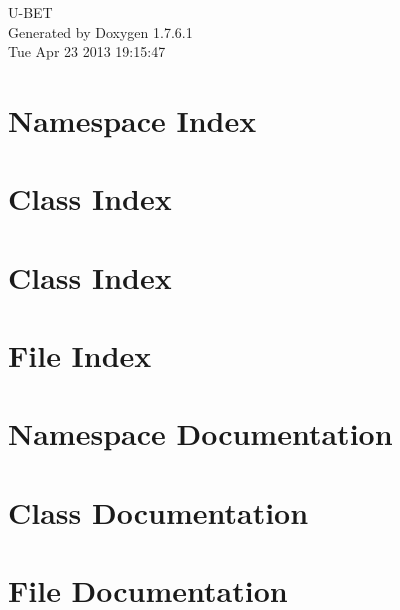 \documentclass[a4paper]{book}
\begin{document}
\hypersetup{pageanchor=false,citecolor=blue}
\begin{titlepage}
\vspace*{7cm}
\begin{center}
{\Large \-U-\/\-B\-E\-T }\\
\vspace*{1cm}
{\large \-Generated by Doxygen 1.7.6.1}\\
\vspace*{0.5cm}
{\small Tue Apr 23 2013 19:15:47}\\
\end{center}
\end{titlepage}
\clearemptydoublepage
{}
\tableofcontents
\clearemptydoublepage
{}
\hypersetup{pageanchor=true,citecolor=blue}
\chapter{\-Namespace \-Index}

\chapter{\-Class \-Index}

\chapter{\-Class \-Index}

\chapter{\-File \-Index}

\chapter{\-Namespace \-Documentation}



\chapter{\-Class \-Documentation}














\chapter{\-File \-Documentation}





























\printindex
\end{document}
